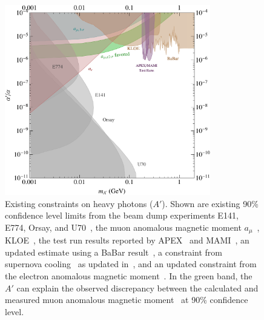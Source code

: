 \begin{figure}[h]
\centering
\includegraphics[width=0.8\textwidth]{limit_g-2_electron.pdf} 
\caption{ Existing constraints on heavy photons ($A'$). 
Shown are existing 90\% confidence level limits from the beam dump experiments 
E141, E774, Orsay, and U70~\cite{Bjorken:2009mm,Blumlein:2011mv,Andreas:2012mt,Riordan:1987aw,Bross:1989mp,Davier:1989wz,Konaka:1986cb}, 
the muon anomalous magnetic moment $a_\mu$~\cite{Pospelov:2008zw},  
KLOE~\cite{Collaboration:2011zc}, 
the test run results reported by APEX~\cite{Abrahamyan:2011gv} and MAMI~\cite{Merkel:2011ze}, 
an updated estimate using a BaBar result~\cite{Bjorken:2009mm,Reece:2009un,Aubert:2009cp},
a constraint from supernova cooling~\cite{Bjorken:2009mm} as updated in~\cite{Dent:2012mx}, 
and an updated constraint from the electron anomalous magnetic moment~\cite{endo:g2e,Davoudiasl:2012ig}. 
In the green band, the $A'$ can explain the observed discrepancy between the
calculated and measured muon anomalous magnetic moment~\cite{Pospelov:2008zw} 
at 90\% confidence level.
}
\label{fig:hspaw-heavy-A'}
\end{figure}

